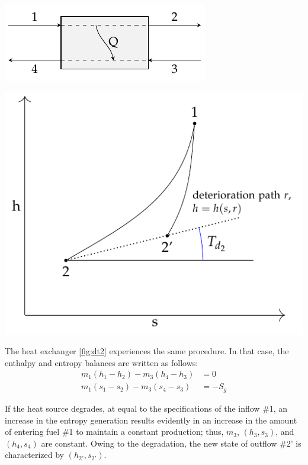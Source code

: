 \documentclass[energies,article,submit,moreauthors,pdftex]{Definitions/mdpi}
\begin{document}
\begin{center}
	\begin{minipage}[c]{0.37\linewidth}
		\centering
		\includegraphics{heater}
	\end{minipage}
	\hskip0.9cm
	\begin{minipage}[c]{0.55\linewidth}
		\centering
		\includegraphics[scale=0.8]{dt2}
	\end{minipage}
	\label{fig:dt2}
\end{center}

The heat exchanger \cref{fig:dt2} experiences the same procedure. In that case, the enthalpy and entropy balances are written as follows: 
\begin{align}
m_1 \left(h_1 - h_2 \right) - m_3 \left(h_4 -h_3\right) &= 0 \\
m_1 \left(s_1 - s_2 \right) - m_3 \left(s_4 - s_3 \right) &= -S_g 
\end{align}

If the heat source degrades, at equal to the specifications of the inflow \#1, an increase in the entropy generation results evidently in an increase in the amount of entering fuel \#1 to maintain a constant production; thus, $m_3$, $(h_3, s_3)$, and $(h_4, s_4)$ are constant. Owing to the degradation, the new state of outflow \#2' is characterized by $(h_{2'}, s_{2'})$.   
\end{document}
